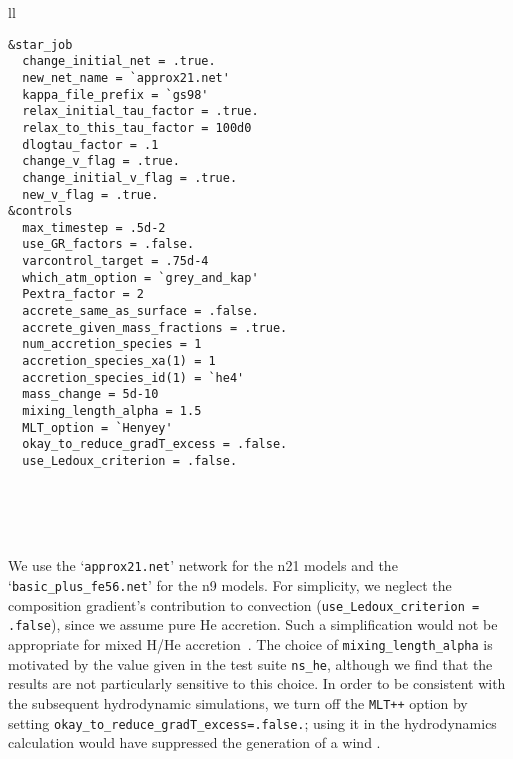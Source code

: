 \documentclass[apj,usenatbib, iop, twocolappendix]{emulateapj}
\newcommand{\nevin}[1]{\textcolor{red}{#1}}
\begin{document}
\begin{tabular}{ll}
\toprule
\toprule
\begin{minipage}{3in}
\begin{verbatim}
&star_job
  change_initial_net = .true.
  new_net_name = `approx21.net'
  kappa_file_prefix = `gs98'
  relax_initial_tau_factor = .true.
  relax_to_this_tau_factor = 100d0
  dlogtau_factor = .1
  change_v_flag = .true.
  change_initial_v_flag = .true.
  new_v_flag = .true.
&controls    
  max_timestep = .5d-2
  use_GR_factors = .false.
  varcontrol_target = .75d-4
  which_atm_option = `grey_and_kap' 
  Pextra_factor = 2
  accrete_same_as_surface = .false. 
  accrete_given_mass_fractions = .true. 
  num_accretion_species = 1
  accretion_species_xa(1) = 1
  accretion_species_id(1) = `he4'
  mass_change = 5d-10
  mixing_length_alpha = 1.5
  MLT_option = `Henyey'    
  okay_to_reduce_gradT_excess = .false.
  use_Ledoux_criterion = .false.
\end{verbatim}
\end{minipage}
\\
\bottomrule
\end{tabular}
\\
\\

We use the `\texttt{approx21.net}' network for the n21 models and the `\texttt{basic\_plus\_fe56.net}' for the n9 models. For simplicity, we neglect the composition gradient's contribution to convection (\texttt{use\_Ledoux\_criterion = .false}), since we assume pure He accretion. Such a simplification would not be appropriate for mixed H/He accretion~. The choice of \texttt{mixing\_length\_alpha} is motivated by the value given in the test suite \texttt{ns\_he}, although we find that the results are not particularly sensitive to this choice.  In order to be consistent with the subsequent hydrodynamic simulations, we turn off the \texttt{MLT++} option by setting \texttt{okay\_to\_reduce\_gradT\_excess=.false.}; using it in the hydrodynamics calculation would have suppressed the generation of a wind \citep{Paxton:13, Quataert:16}. %
\end{document}
